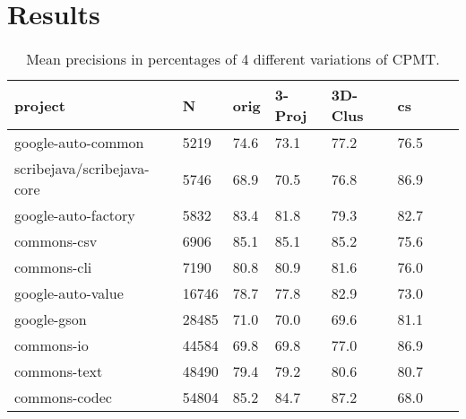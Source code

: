 \documentclass[twoside]{uva-inf-bachelor-thesis}
\begin{document}
\section{Results}
\begin{table}[h]
    \centering
    \begin{tabular}{|l|l|l|l|l|l|l|l|}
    \hline
        project & N & orig & 3-Proj & 3D-Clus & cs \\ \hline
        google-auto-common & 5219 & 74.6 & 73.1 & 77.2 & 76.5 \\ \hline
        scribejava/scribejava-core & 5746 & 68.9 & 70.5 & 76.8 & 86.9 \\ \hline
        google-auto-factory & 5832 & 83.4 & 81.8 & 79.3 & 82.7 \\ \hline
        commons-csv & 6906 & 85.1 & 85.1 & 85.2 & 75.6 \\ \hline
        commons-cli & 7190 & 80.8 & 80.9 & 81.6 & 76.0 \\ \hline
        google-auto-value & 16746 & 78.7 & 77.8 & 82.9 & 73.0 \\ \hline
        google-gson & 28485 & 71.0 & 70.0 & 69.6 & 81.1 \\ \hline
        commons-io & 44584 & 69.8 & 69.8 & 77.0 & 86.9 \\ \hline
        commons-text & 48490 & 79.4 & 79.2 & 80.6 & 80.7 \\ \hline
        commons-codec & 54804 & 85.2 & 84.7 & 87.2 & 68.0 \\ \hline
    \end{tabular}
    \label{tab:cpmt}
\caption{Mean precisions in percentages of 4 different variations of CPMT.}
\end{table}
\end{document}
